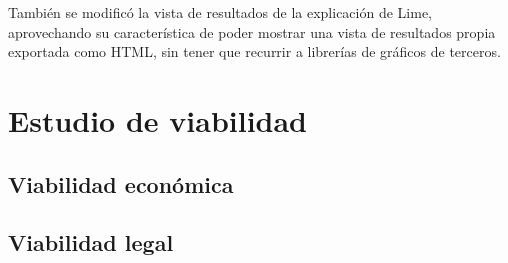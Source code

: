 También se modificó la vista de resultados de la explicación de Lime, aprovechando su característica de poder mostrar una vista de resultados propia exportada como HTML, sin tener que recurrir a librerías de gráficos de terceros.

\section{Estudio de viabilidad}

\subsection{Viabilidad económica}

\subsection{Viabilidad legal}


